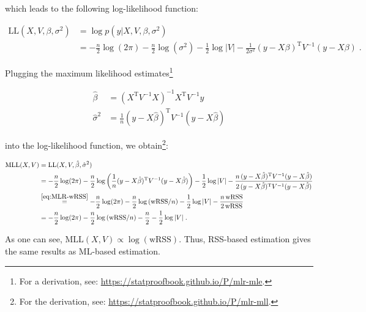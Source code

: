 \documentclass[a4paper,12pt]{article}
\begin{document}
which leads to the following log-likelihood function:

\vspace{-0.5em}
\begin{equation} \label{eq:MLR-LLF}
\begin{split}
\mathrm{LL}(X,V,\beta,\sigma^2) &= \log p(y|X,V,\beta,\sigma^2) \\
&= - \frac{n}{2} \log(2\pi) - \frac{n}{2} \log (\sigma^2) - \frac{1}{2} \log|V| - \frac{1}{2 \sigma^2} (y - X\beta)^\mathrm{T} V^{-1} (y - X\beta) \; .
\end{split}
\end{equation}

Plugging the maximum likelihood estimates\footnote{For a derivation, see: \url{https://statproofbook.github.io/P/mlr-mle}.}

\vspace{-0.5em}
\begin{equation} \label{eq:MLR-MLE}
\begin{split}
\hat{\beta} &= (X^\mathrm{T} V^{-1} X)^{-1} X^\mathrm{T} V^{-1} y \\
\hat{\sigma}^2 &= \frac{1}{n} (y-X\hat{\beta})^\mathrm{T} V^{-1} (y-X\hat{\beta})
\end{split}
\end{equation}

into the log-likelihood function, we obtain\footnote{For the derivation, see: \url{https://statproofbook.github.io/P/mlr-mll}.}:

\vspace{-0.5em}
\begin{equation} \label{eq:MLR-MLL}
\begin{split}
\mathrm{MLL}(X,V) &= \mathrm{LL}(X,V,\hat{\beta},\hat{\sigma}^2) \\
&= - \frac{n}{2} \log(2\pi) - \frac{n}{2} \log\left( \frac{1}{n} (y-X\hat{\beta})^\mathrm{T} V^{-1} (y-X\hat{\beta}) \right) - \frac{1}{2} \log|V| - \frac{n \, (y-X\hat{\beta})^\mathrm{T} V^{-1} (y-X\hat{\beta})}{2 \, (y-X\hat{\beta})^\mathrm{T} V^{-1} (y-X\hat{\beta})} \\
&\overset{\eqref{eq:MLR-wRSS}}{=} - \frac{n}{2} \log(2\pi) - \frac{n}{2} \log\left( \mathrm{wRSS}/n \right) - \frac{1}{2} \log|V| - \frac{n \, \mathrm{wRSS}}{2 \, \mathrm{wRSS}} \\
&= - \frac{n}{2} \log(2\pi) - \frac{n}{2} \log\left( \mathrm{wRSS}/n \right) - \frac{n}{2} - \frac{1}{2} \log|V| \; .
\end{split}
\end{equation}

As one can see, $\mathrm{MLL}(X,V) \propto \log(\mathrm{wRSS})$. Thus, RSS-based estimation gives the same results as ML-based estimation.
\end{document}
